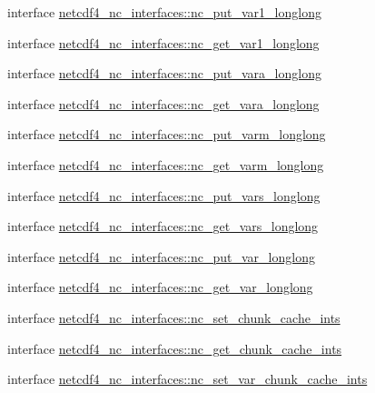 \begin{DoxyCompactItemize}
\item 
interface \hyperlink{interfacenetcdf4__nc__interfaces_1_1nc__put__var1__longlong}{netcdf4\+\_\+nc\+\_\+interfaces\+::nc\+\_\+put\+\_\+var1\+\_\+longlong}
\item 
interface \hyperlink{interfacenetcdf4__nc__interfaces_1_1nc__get__var1__longlong}{netcdf4\+\_\+nc\+\_\+interfaces\+::nc\+\_\+get\+\_\+var1\+\_\+longlong}
\item 
interface \hyperlink{interfacenetcdf4__nc__interfaces_1_1nc__put__vara__longlong}{netcdf4\+\_\+nc\+\_\+interfaces\+::nc\+\_\+put\+\_\+vara\+\_\+longlong}
\item 
interface \hyperlink{interfacenetcdf4__nc__interfaces_1_1nc__get__vara__longlong}{netcdf4\+\_\+nc\+\_\+interfaces\+::nc\+\_\+get\+\_\+vara\+\_\+longlong}
\item 
interface \hyperlink{interfacenetcdf4__nc__interfaces_1_1nc__put__varm__longlong}{netcdf4\+\_\+nc\+\_\+interfaces\+::nc\+\_\+put\+\_\+varm\+\_\+longlong}
\item 
interface \hyperlink{interfacenetcdf4__nc__interfaces_1_1nc__get__varm__longlong}{netcdf4\+\_\+nc\+\_\+interfaces\+::nc\+\_\+get\+\_\+varm\+\_\+longlong}
\item 
interface \hyperlink{interfacenetcdf4__nc__interfaces_1_1nc__put__vars__longlong}{netcdf4\+\_\+nc\+\_\+interfaces\+::nc\+\_\+put\+\_\+vars\+\_\+longlong}
\item 
interface \hyperlink{interfacenetcdf4__nc__interfaces_1_1nc__get__vars__longlong}{netcdf4\+\_\+nc\+\_\+interfaces\+::nc\+\_\+get\+\_\+vars\+\_\+longlong}
\item 
interface \hyperlink{interfacenetcdf4__nc__interfaces_1_1nc__put__var__longlong}{netcdf4\+\_\+nc\+\_\+interfaces\+::nc\+\_\+put\+\_\+var\+\_\+longlong}
\item 
interface \hyperlink{interfacenetcdf4__nc__interfaces_1_1nc__get__var__longlong}{netcdf4\+\_\+nc\+\_\+interfaces\+::nc\+\_\+get\+\_\+var\+\_\+longlong}
\item 
interface \hyperlink{interfacenetcdf4__nc__interfaces_1_1nc__set__chunk__cache__ints}{netcdf4\+\_\+nc\+\_\+interfaces\+::nc\+\_\+set\+\_\+chunk\+\_\+cache\+\_\+ints}
\item 
interface \hyperlink{interfacenetcdf4__nc__interfaces_1_1nc__get__chunk__cache__ints}{netcdf4\+\_\+nc\+\_\+interfaces\+::nc\+\_\+get\+\_\+chunk\+\_\+cache\+\_\+ints}
\item 
interface \hyperlink{interfacenetcdf4__nc__interfaces_1_1nc__set__var__chunk__cache__ints}{netcdf4\+\_\+nc\+\_\+interfaces\+::nc\+\_\+set\+\_\+var\+\_\+chunk\+\_\+cache\+\_\+ints}

\end{DoxyCompactItemize}
